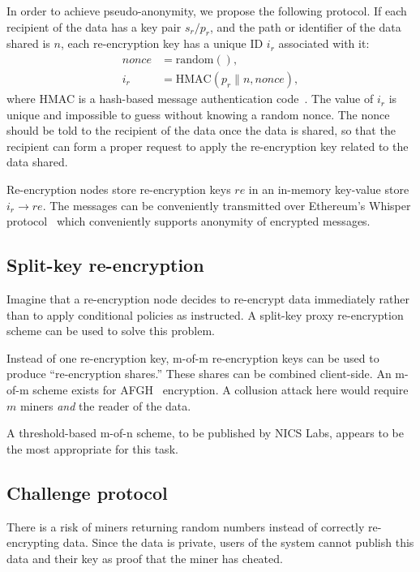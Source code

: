 \documentclass[longbibliography]{revtex4-1}
\begin{document}
In order to achieve pseudo-anonymity, we propose the following protocol.
If each recipient of the data has a key pair $s_r/p_r$, and the path or identifier of the data shared is $n$,
each re-encryption key has a unique ID $i_r$ associated with it:
\begin{align}
    nonce &= \text{random}(), \\
    i_r &= \text{HMAC}(p_r \| n, nonce),
\end{align}
where HMAC is a hash-based message authentication code~\cite{wiki:hmac}.
The value of $i_r$ is unique and impossible to guess without knowing a random nonce.
The nonce should be told to the recipient of the data once the data is shared, so that the recipient can form a proper request to apply the re-encryption key
related to the data shared.

Re-encryption nodes store re-encryption keys $re$ in an in-memory key-value store $i_r\rightarrow re$.
The messages can be conveniently transmitted over Ethereum's Whisper protocol~\cite{eth:whisper} which conveniently supports
anonymity of encrypted messages.

\subsection{Split-key re-encryption}

Imagine that a re-encryption node decides to re-encrypt data immediately rather than to apply conditional policies as instructed.
A split-key proxy re-encryption scheme can be used to solve this problem.

Instead of one re-encryption key, m-of-m re-encryption keys can be used to produce ``re-encryption shares.''
These shares can be combined client-side.
An m-of-m scheme exists for AFGH~\cite{AFGH} encryption.
A collusion attack here would require $m$ miners \emph{and} the reader of the data.

A threshold-based m-of-n scheme, to be published by NICS Labs, appears to be the most appropriate for this task.

\subsection{Challenge protocol}
\label{sec:challenge-protocol}

There is a risk of miners returning random numbers instead of correctly re-encrypting data.
Since the data is private, users of the system cannot publish this data and their key as proof that the miner has cheated.
\end{document}
